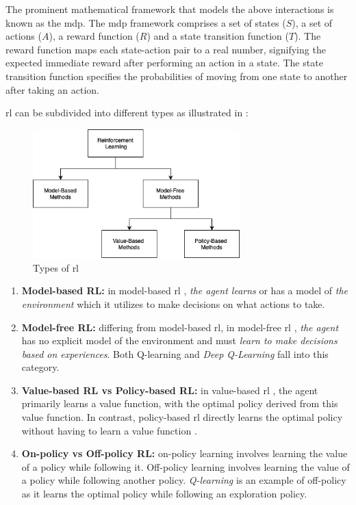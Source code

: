 \documentclass[12pt,a4paper,openright,twoside]{book}
\begin{document}
The prominent mathematical framework that models the above interactions is known as the \ac{mdp}. The \ac{mdp} framework comprises a set of states ($S$), a set of actions ($A$), a reward function ($R$) and a state transition function ($T$). 
The reward function maps each state-action pair to a real number, signifying the expected immediate reward after performing an action in a state. 
The state transition function specifies the probabilities of moving from one state to another after taking an action.

\ac{rl} can be subdivided into different types as illustrated in :
\begin{figure}
    \centering
    \includegraphics[width=8cm]{img/typesofrl.jpg}
    \caption{Types of \ac{rl}}
    \label{fig:z}
\end{figure}
\begin{enumerate}
    \item \textbf{Model-based RL:} in model-based \ac{rl} \cite{DBLP:journals/corr/abs-2006-16712}, \emph{the agent learns} or has a model of \emph{the environment} which it utilizes to make decisions on what actions to take.
    \item \textbf{Model-free RL:} differing from model-based \ac{rl}, in model-free \ac{rl} \cite{Sutton1998}, \emph{the agent} has no explicit model of the environment and must \emph{learn to make decisions based on experiences}. Both Q-learning \cite{qlearning} and \emph{Deep Q-Learning} fall into this category.
    \item \textbf{Value-based RL vs Policy-based RL:} in value-based \ac{rl} \cite{Sutton1998}, the agent primarily learns a value function, with the optimal policy derived from this value function. In contrast, policy-based \ac{rl} directly learns the optimal policy without having to learn a value function \cite{inbook}.
    \item \textbf{On-policy vs Off-policy RL:} on-policy learning \cite{andrychowicz2020matters} involves learning the value of a policy while following it. Off-policy learning \cite{degris2013offpolicy} involves learning the value of a policy while following another policy. \emph{Q-learning} is an example of off-policy as it learns the optimal policy while following an exploration policy.
\end{enumerate}
\end{document}

